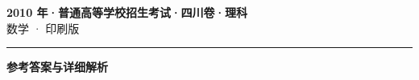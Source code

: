 \documentclass[zihao=5, a4paper]{ctexart}
\begin{document}
\begin{center}
  {\Large\bfseries 2010 年·普通高等学校招生考试·四川卷·理科}\\[4pt]
  {\large 数学 · 印刷版}
\end{center}
\medskip
{}

\par\bigskip\hrule\bigskip
{}
\begin{center}{\large\bfseries 参考答案与详细解析}\end{center}
\smallskip

\end{document}
